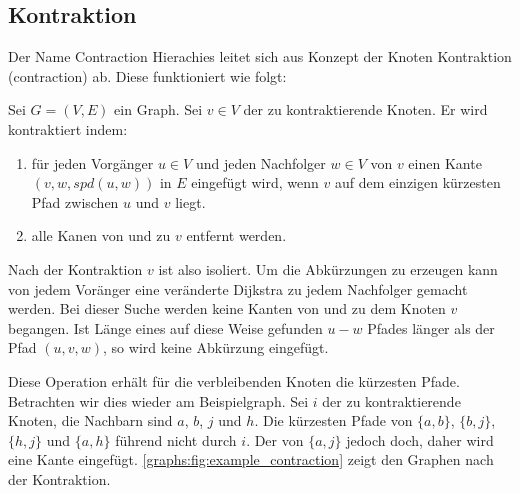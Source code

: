 \subsection{Kontraktion}

Der Name Contraction Hierachies leitet sich aus Konzept der Knoten Kontraktion (contraction) ab.
Diese funktioniert wie folgt:

\begin{definition}
    Sei $G = (V, E)$ ein Graph. Sei $v \in V$ der zu kontraktierende Knoten. Er wird kontraktiert indem:

    \begin{enumerate}
        \item\label{ch:contraction:when_shortcut}
        für jeden Vorgänger $u \in V$ und jeden Nachfolger $w \in V$ von $v$ einen Kante $(v, w, {spd}(u, w))$ in $E$ eingefügt wird, wenn $v$ auf dem einzigen kürzesten Pfad zwischen $u$ und $v$ liegt.

        \item
              alle Kanen von und zu $v$ entfernt werden.
    \end{enumerate}
\end{definition}

Nach der Kontraktion $v$ ist also isoliert.
Um die Abkürzungen zu erzeugen kann von jedem Voränger eine veränderte Dijkstra zu jedem Nachfolger gemacht werden.
Bei dieser Suche werden keine Kanten von und zu dem Knoten $v$ begangen.
Ist Länge eines auf diese Weise gefunden $u-w$ Pfades länger als der Pfad $(u, v, w)$, so wird keine Abkürzung eingefügt.

Diese Operation erhält für die verbleibenden Knoten die kürzesten Pfade.
Betrachten wir dies wieder am Beispielgraph.
Sei $i$ der zu kontraktierende Knoten, die Nachbarn sind $a$, $b$, $j$ und $h$.
Die kürzesten Pfade von $\{a, b\}$, $\{b, j\}$, $\{h, j\}$ und $\{a, h\}$ führend nicht durch $i$.
Der von $\{a, j\}$ jedoch doch, daher wird eine Kante eingefügt.
\autoref{graphs:fig:example_contraction} zeigt den Graphen nach der Kontraktion.


